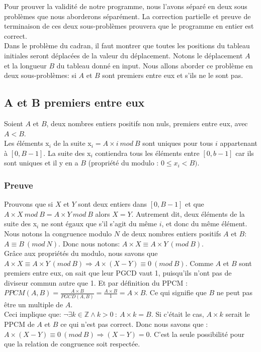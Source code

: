 Pour prouver la validité de notre programme, nous l'avons séparé en deux sous problèmes que nous aborderons séparément. La correction partielle et preuve de terminaison de ces deux sous-problèmes prouvera que le programme en entier est correct.\\
Dans le problème du cadran, il faut montrer que toutes les positions du tableau initiales seront déplacées de la valeur du déplacement. Notons le déplacement $A$ et la longueur $B$ du tableau donné en input. Nous allons aborder ce problème en deux sous-problèmes: si $A$ et $B$ sont premiers entre eux et s'ils ne le sont pas.\\  

\subsection{A et B premiers entre eux}
Soient $A$ et $B$, deux nombres entiers positifs non nuls, premiers entre eux, avec $A < B$.\\
Les éléments x$_{i}$ de la suite x$_{i} = A \times i\ mod\ B$ sont uniques pour tous $i$ appartenant à $[0, B-1]$.
La suite des x$_{i}$ contiendra tous les éléments entre $[0, b-1]$ car ils sont uniques et il y en a $B$ (propriété du modulo : $0\leq x_i < B)$.

\subsubsection* {Preuve}
Prouvons que si $X$ et $Y$ sont deux entiers dans $[0, B-1]$ et que $A\times X\ mod\ B = A\times Y\ mod\ B$ alors $X = Y$. Autrement dit, deux éléments de la suite des x$_{i}$ ne sont égaux que s'il s'agit du même $i$, et donc du même élément. Nous notons la congruence modulo $N$ de deux nombres entiers positifs $A$ et $B$: $A \equiv B\ (mod\ N)$. Donc nous notons: $A\times X ≡ A\times Y\ (mod\ B)$.\\

Grâce aux propriétés du modulo, nous savons que $A\times X ≡ A\times Y\ (mod\ B) \Rightarrow A\times (X-Y) ≡ 0\ (mod\ B).$ Comme $A$ et $B$ sont premiers entre eux, on sait que leur PGCD vaut 1, puisqu'ils n'ont pas de diviseur commun autre que 1. Et par définition du PPCM : $PPCM(A,B) = \frac{A\times B}{PGCD(A,B)} = \frac{A\times B} {1} = A\times B$. Ce qui signifie que $B$ ne peut pas être un multiple de $A$.\\

Ceci implique que: $\neg  \exists k \in \mathbb{Z} \wedge k>0\ :\ A\times k = B$. Si c'était le cas, $A\times k$ serait le PPCM de $A$ et $B$ ce qui n'est pas correct. Donc nous savons que : $A\times (X-Y) ≡ 0\ (mod\ B) \Rightarrow (X-Y) = 0$. C'est la seule possibilité pour que la relation de congruence soit respectée.\\

